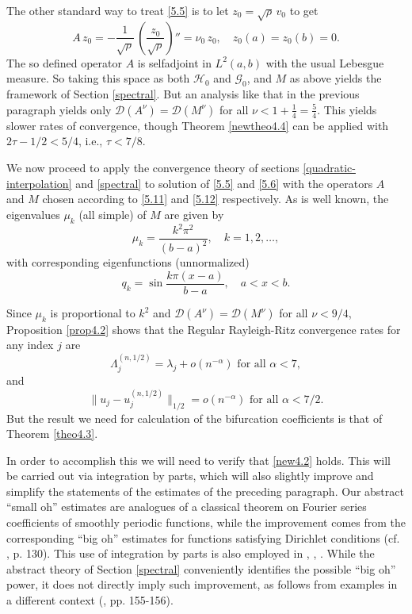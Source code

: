 \documentclass[final]{siamltex}
\numberwithin{equation}{section}
\begin{document}
The other standard way to treat \eqref{5.5} is to let $z_0=\sqrt{\rho} \, v_0$ to get
\[A \, z_0 =-\frac{1}{\sqrt{\rho}} \, \left( \frac{z_0}{\sqrt{\rho}}\right)'' = \nu_0 \, z_0, \quad z_0(a)=z_0(b)=0. \]
The so defined operator $A$ is selfadjoint in $L^2(a,b)$ with the usual
Lebesgue measure. So taking this space as both $\mathcal{H}_0$
and $\mathcal{G}_0$, and $M$ as above yields the framework of Section \ref{spectral}.
But an analysis like that in the previous paragraph yields
only $\mathcal{D}(A^{\nu}) = \mathcal{D}(M^{\nu})$ for all $\nu <1+ \frac{1}{4}=\frac{5}{4}$. This yields slower rates of convergence, though Theorem \ref{newtheo4.4} can be applied with $2 \tau -1/2<5/4$, i.e., $\tau<7/8$.

We now proceed to apply the convergence theory of sections \ref{quadratic-interpolation} and \ref{spectral} to solution of \eqref{5.5} and \eqref{5.6} with the operators $A$ and $M$ chosen according to \eqref{5.11} and \eqref{5.12} respectively. As is well known, the eigenvalues $\mu_k$ (all simple) of $M$ are given by
\[\mu_k=\frac{k^2 \pi^2}{(b-a)^2}, \quad k=1, 2, \ldots,\]
with corresponding eigenfunctions (unnormalized)
\[q_k=\sin \frac{k \pi(x-a)}{b-a}, \quad a<x<b.\]

Since $\mu_k$ is proportional to $k^2$ and $\mathcal{D}(A^{\nu})=
\mathcal{D}(M^{\nu})$ for all $\nu<9/4$, Proposition \ref{prop4.2} shows that the Regular Rayleigh-Ritz convergence rates for any index $j$ are
\[\Lambda_j^{(n, 1/2)} = \lambda_j + o(n^{-\alpha}) \text{ for all } \alpha <7,\]
and
\[\|u_j - u_j^{(n,1/2)}\|_{1/2}= o(n^{- \alpha}) \text{ for all } \alpha <7/2.\]
But the result we need for calculation of the bifurcation coefficients is that of Theorem \ref{theo4.3}.

In order to accomplish this we will need to verify that \eqref{new4.2} holds. This will be carried out via integration by parts, which will also slightly improve and simplify the statements of the estimates of the preceding paragraph. Our abstract ``small oh'' estimates are analogues of a classical theorem on Fourier series coefficients of smoothly periodic functions, while the improvement comes from the corresponding ``big oh'' estimates for functions satisfying Dirichlet conditions (cf. \cite{Stakgold}, p. 130). This use of integration by parts is also employed in \cite{Bernardi-Maday}, \cite{Birk-Fix}, \cite{Boyd}. While the abstract theory of Section \ref{spectral} conveniently identifies the possible ``big oh'' power, it does not directly imply such improvement, as follows from examples in a different context (\cite{Greenlee}, pp. 155-156).
\end{document}
